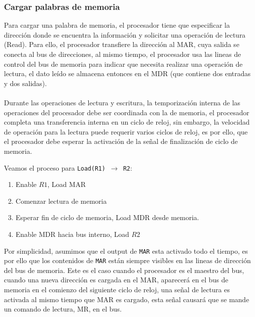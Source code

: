 \subsubsection{Cargar palabras de memoria}
Para cargar una palabra de memoria, el procesador tiene que especificar la dirección donde se encuentra la información y solicitar una operación de lectura (Read). Para ello, el procesador transfiere
la dirección al MAR, cuya salida se conecta al bus de direcciones, al mismo tiempo, el procesador usa las lineas de control del bus de memoria para indicar que necesita realizar una operación de lectura,
el dato leído se almacena entonces en el MDR (que contiene dos entradas y dos salidas).
\\ \\ 
Durante las operaciones de lectura y escritura, la temporización interna de las operaciones del procesador debe ser coordinada con la de memoria, el procesador completa una transferencia interna en un ciclo de reloj, sin embargo,
la velocidad de operación para la lectura puede requerir varios ciclos de reloj, es por ello, que el procesador debe esperar la activación de la señal de finalización de ciclo de memoria.
\begin{ejemplo}
    Veamos el proceso para \texttt{Load(R1) $\rightarrow$ R2}:
   \begin{enumerate}
       \item Enable $R1$, Load MAR
    \item Comenzar lectura de memoria
    \item Esperar fin de ciclo de memoria, Load MDR desde memoria.
    \item Enable MDR hacia bus interno, Load $R2$
   \end{enumerate}
\end{ejemplo}
Por simplicidad, asumimos que el output de \texttt{MAR} esta activado todo el tiempo, es por ello
que los contenidos de \texttt{MAR} están siempre visibles en las lineas de dirección del bus de memoria.
Este es el caso cuando el procesador es el maestro del bus, cuando una nueva dirección es cargada en el MAR,
aparecerá en el bus de memoria en el comienzo del siguiente ciclo de reloj, una señal de lectura es activada al mismo tiempo
que MAR es cargado, esta señal causará que se mande un comando de lectura, MR, en el bus.
